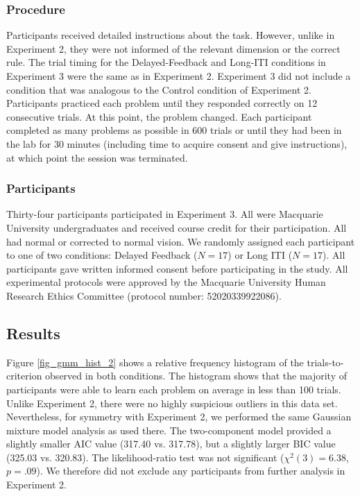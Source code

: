 \documentclass[doc, floatsintext]{apa7}
\begin{document}
\subsubsection{Procedure}
Participants received detailed instructions about the task.
However, unlike in Experiment 2, they were not informed of
the relevant dimension or the correct rule. The trial timing
for the Delayed-Feedback and Long-ITI conditions in
Experiment 3 were the same as in Experiment 2. Experiment 3
did not include a condition that was analogous to the
Control condition of Experiment 2. Participants practiced
each problem until they responded correctly on 12
consecutive trials. At this point, the problem changed. Each
participant completed as many problems as possible in 600
trials or until they had been in the lab for 30 minutes
(including time to acquire consent and give instructions),
at which point the session was terminated.

\subsubsection{Participants}
Thirty-four participants participated in Experiment 3. All
were Macquarie University undergraduates and received course
credit for their participation. All had normal or corrected
to normal vision. We randomly assigned each participant to
one of two conditions: Delayed Feedback ($N = 17$) or Long
ITI ($N = 17$).  All participants gave written informed
consent before participating in the study. All experimental
protocols were approved by the Macquarie University Human
Research Ethics Committee (protocol number: 52020339922086). 

\subsection{Results}
Figure \ref{fig_gmm_hist_2} shows a relative frequency
histogram of the trials-to-criterion observed in both
conditions. The histogram shows that the majority of
participants were able to learn each problem on average in
less than 100 trials.  Unlike Experiment 2, there were no
highly suspicious outliers in this data set. Nevertheless,
for symmetry with Experiment 2, we performed the same
Gaussian mixture model analysis as used there. The
two-component model provided a slightly smaller AIC value
(317.40 vs. 317.78), but a slightly larger BIC value (325.03
vs. 320.83). The likelihood-ratio test was not significant
($\chi^2(3) = 6.38$, $p = .09$). We therefore did not
exclude any participants from further analysis in Experiment
2.
\end{document}
